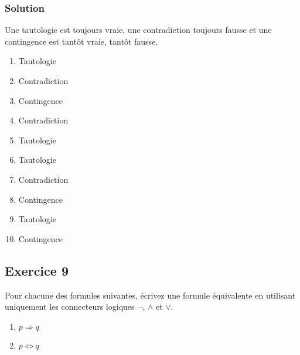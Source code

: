 \subsubsection*{Solution}


    Une tautologie est toujours vraie, une contradiction toujours fausse et une contingence est tantôt vraie, tantôt fausse.

    \begin{enumerate}
        \item Tautologie
        \item Contradiction
        \item Contingence
        \item Contradiction
        \item Tautologie
        \item Tautologie
        \item Contradiction
        \item Contingence
        \item Tautologie
        \item Contingence
    \end{enumerate}

%

\subsection*{Exercice 9}
Pour chacune des formules suivantes, écrivez une formule équivalente
en utilisant uniquement les connecteurs logiques $\neg$, $\land$ et $\lor$.
\begin{enumerate}
	\item $p \Rightarrow q$
	\item $p \Leftrightarrow q$
\end{enumerate}



